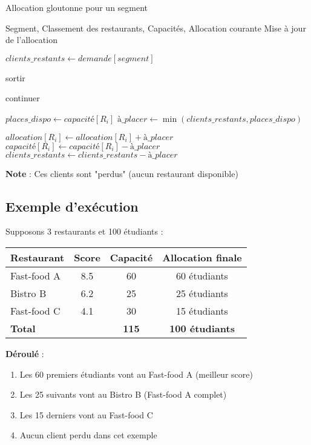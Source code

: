 \documentclass[12pt,a4paper]{article}
\begin{document}
\begin{algorithm}[H]
\caption{Allocation gloutonne pour un segment}
\begin{algorithmic}[1]
\REQUIRE Segment, Classement des restaurants, Capacités, Allocation courante
\ENSURE Mise à jour de l'allocation

\STATE $clients\_restants \leftarrow demande[segment]$

        \STATE sortir 
    \ENDIF

        \STATE continuer 
    \ENDIF

    \STATE $places\_dispo \leftarrow capacité[R_i]$
    \STATE $à\_placer \leftarrow \min(clients\_restants, places\_dispo)$

    \STATE $allocation[R_i] \leftarrow allocation[R_i] + à\_placer$
    \STATE $capacité[R_i] \leftarrow capacité[R_i] - à\_placer$
    \STATE $clients\_restants \leftarrow clients\_restants - à\_placer$
\ENDFOR

    \STATE \textbf{Note} : Ces clients sont "perdus" (aucun restaurant disponible)
\ENDIF
\end{algorithmic}
\end{algorithm}

\subsection{Exemple d'exécution}

Supposons 3 restaurants et 100 étudiants :

\begin{center}
\begin{tabular}{lccc}
\toprule
Restaurant & Score & Capacité & Allocation finale \\
\midrule
Fast-food A & 8.5 & 60 & 60 étudiants \\
Bistro B & 6.2 & 25 & 25 étudiants \\
Fast-food C & 4.1 & 30 & 15 étudiants \\
\midrule
\textbf{Total} & & \textbf{115} & \textbf{100 étudiants} \\
\bottomrule
\end{tabular}
\end{center}

\textbf{Déroulé} :
\begin{enumerate}
    \item Les 60 premiers étudiants vont au Fast-food A (meilleur score)
    \item Les 25 suivants vont au Bistro B (Fast-food A complet)
    \item Les 15 derniers vont au Fast-food C
    \item Aucun client perdu dans cet exemple
\end{enumerate}
\end{document}
